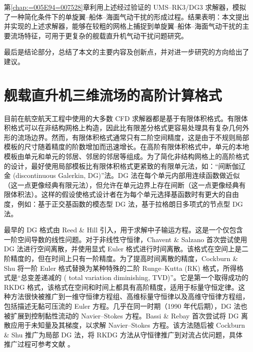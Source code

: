 第\ref{chap:=005E94=007528}章利用上述经过验证的 UMS–RK3/DG3 求解器，模拟了一种简化条件下的单旋翼–船体–海面气动干扰的形成过程。结果表明：本文提出并实现的上述求解器，能够在较粗的网格上捕捉到单旋翼–船体–海面气动干扰的主要流场特征，可用于更复杂的舰载直升机气动干扰问题研究。

最后是结论部分，总结了本文的主要内容及创新点，并对进一步研究的方向给出了建议。

\chapter{舰载直升机三维流场的高阶计算格式\label{chap:=007B97=006CD5}}

目前在航空航天工程中使用的大多数 CFD 求解器都是基于有限体积格式。有限体积格式可以在非结构网格上构造，因此比有限差分格式更容易处理具有复杂几何外形的流场边界。然而，有限体积格式通常只有二阶空间精度，这是由于不规则局部模板的尺寸随着精度的阶数增加而迅速增长。在高阶有限体积格式中，单元的本地模板由单元和单元的邻居、邻居的邻居等组成。为了简化非结构网格上的高阶格式的设计，最好使用局部模板比有限体积格式更紧致的有限单元法，如：“间断伽辽金
(discontinuous Galerkin, DG)”法。DG 法在每个单元内部用连续函数做近似（这一点更像经典有限元法），但允许在单元边界上存在间断（这一点更像经典有限体积法）。这样的假设使格式设计者在为每个单元选择基函数时有更大的自由度，例如：基于正交基函数的模态型
DG 法，基于拉格朗日多项式的节点型 DG 法。

最早的 DG 格式由 Reed \& Hill 引入，用于求解中子输运方程。这是一个仅包含一阶空间导数的线性问题。对于非线性守恒律，Chavent
\& Salzano 首次尝试使用 DG 法进行空间离散，并使用显式 Euler 格式进行时间离散。该格式在空间上是二阶精度的，但在时间上只有一阶精度。为了提高时间离散的精度，Cockburn
\& Shu 将一阶 Euler 格式替换为某种特殊的二阶 Runge–Kutta (RK)
格式，所得格式是“总变差递减的 ( total variation diminishing,
TVD)”。它是第一个取得成功的 RKDG 格式，该格式在空间和时间上都具有高阶精度，适用于标量守恒定律。这种方法很快被推广到一维守恒律方程组、高维标量守恒律以及高维守恒律方程组，包括描述无黏可压流的
Euler 方程。几乎在同一时期（1990 年代后期），DG 法也被扩展到控制黏性流动的 Navier–Stokes 方程。Bassi
\& Rebay 首次尝试将 DG 离散应用于未知量及其梯度，以求解 Navier–Stokes
方程。该方法随后被 Cockburn \& Shu 推广为局部 DG 法，将 RKDG
方法从守恒律推广到对流占优问题，具体推广过程可参考文献 \cite{Cockburn_2001}。

